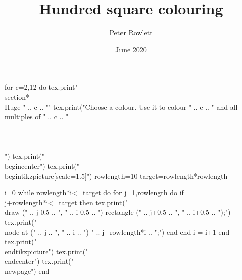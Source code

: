 \documentclass[a4paper,11pt]{article}
\title{Hundred square colouring}
\author{Peter Rowlett}
\date{June 2020}
\begin{document}
\huge
\begin{luacode*}
    for c=2,12 do
        tex.print{"\\section*{\\Huge " .. c .. "}"}
        tex.print("Choose a colour. Use it to colour " .. c .. " and all multiples of " .. c .. "\\\\\\\\")
        tex.print("\\begin{center}")
        tex.print("\\begin{tikzpicture}[scale=1.5]")
        rowlength=10
        target=rowlength*rowlength
        
        i=0
        while rowlength*i<=target do
            for j=1,rowlength do
                if j+rowlength*i<=target then
                    tex.print("\\draw (" .. j-0.5 .. ",-" .. i-0.5 .. ") rectangle (" .. j+0.5 .. ",-" .. i+0.5 .. ");")
                    tex.print("\\node at (" .. j .. ",-" .. i .. ") {" .. j+rowlength*i .. "};")
                end
            end
            i = i+1
        end
        tex.print("\\end{tikzpicture}")
        tex.print("\\end{center}")
        tex.print("\\newpage")
    end
\end{luacode*}
\end{document}
